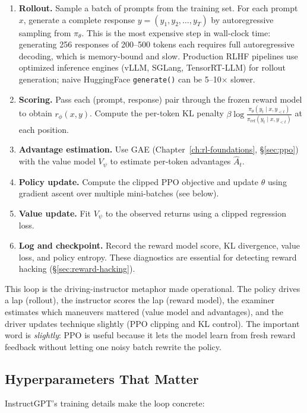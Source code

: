 \begin{enumerate}[nosep]
  \item \textbf{Rollout.} Sample a batch of prompts from the training set. For each prompt $x$, generate a complete response $y = (y_1, y_2, \ldots, y_T)$ by autoregressive sampling from $\pi_\theta$. This is the most expensive step in wall-clock time: generating 256 responses of 200--500 tokens each requires full autoregressive decoding, which is memory-bound and slow. Production RLHF pipelines use optimized inference engines (vLLM, SGLang, TensorRT-LLM) for rollout generation; naive HuggingFace \texttt{generate()} can be 5--10$\times$ slower.
  \item \textbf{Scoring.} Pass each (prompt, response) pair through the frozen reward model to obtain $r_\phi(x, y)$. Compute the per-token KL penalty $\beta \log \frac{\pi_\theta(y_t \mid x, y_{<t})}{\pi_{\text{ref}}(y_t \mid x, y_{<t})}$ at each position.
  \item \textbf{Advantage estimation.} Use GAE (Chapter~\ref{ch:rl-foundations}, \S\ref{sec:ppo}) with the value model $V_\psi$ to estimate per-token advantages $\hat{A}_t$.
  \item \textbf{Policy update.} Compute the clipped PPO objective and update $\theta$ using gradient ascent over multiple mini-batches (see below).
  \item \textbf{Value update.} Fit $V_\psi$ to the observed returns using a clipped regression loss.
  \item \textbf{Log and checkpoint.} Record the reward model score, KL divergence, value loss, and policy entropy. These diagnostics are essential for detecting reward hacking (\S\ref{sec:reward-hacking}).
\end{enumerate}

This loop is the driving-instructor metaphor made operational. The policy drives a lap (rollout), the instructor scores the lap (reward model), the examiner estimates which maneuvers mattered (value model and advantages), and the driver updates technique slightly (PPO clipping and KL control). The important word is \emph{slightly}: PPO is useful because it lets the model learn from fresh reward feedback without letting one noisy batch rewrite the policy.

\subsection{Hyperparameters That Matter}

InstructGPT's training details make the loop concrete:

